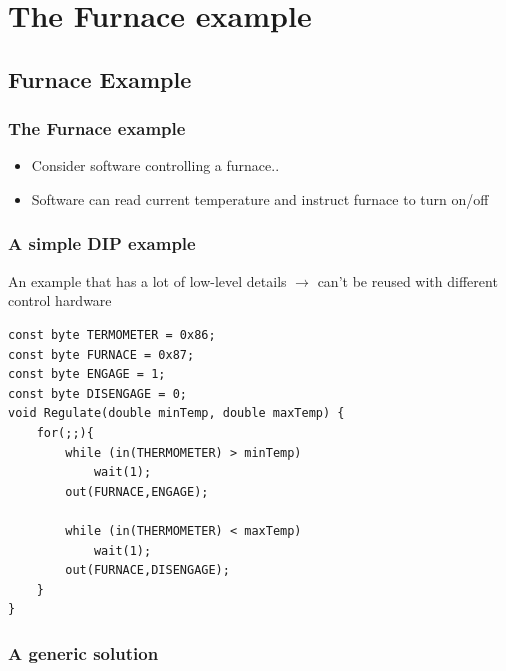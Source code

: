 \documentclass{beamer}
\begin{document}
\section{The Furnace example}
\subsection{Furnace Example}
\begin{frame}
  \frametitle{The Furnace example}
  \begin{itemize}
	\item<+-> Consider software controlling a furnace.. 
	\item<+-> Software can read current temperature and instruct furnace to turn on/off
   \end{itemize}
\end{frame}

\begin{frame}[containsverbatim]
	\frametitle{A simple DIP example}
	An example that has a lot of low-level details $ \rightarrow $ can't be reused with different control hardware \\
	\begin{lstlisting}
const byte TERMOMETER = 0x86;
const byte FURNACE = 0x87;
const byte ENGAGE = 1;
const byte DISENGAGE = 0;
void Regulate(double minTemp, double maxTemp) {
	for(;;){
		while (in(THERMOMETER) > minTemp)
			wait(1);
		out(FURNACE,ENGAGE);
		
		while (in(THERMOMETER) < maxTemp)
			wait(1);
		out(FURNACE,DISENGAGE);
	}
}
	\end{lstlisting}
\end{frame}


\begin{frame}
	\frametitle{A generic solution}
	\begin{center}
	\end{center}
\end{frame}
\end{document}
